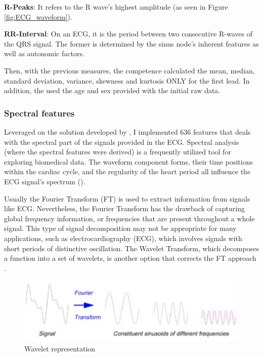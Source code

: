 \textbf{R-Peaks}: It refers to the R wave's highest amplitude (as seen in Figure \ref{fig:ECG_waveform}).

\textbf{RR-Interval}: On an ECG, it is the period between two consecutive R-waves of the QRS signal. The former is determined by the sinus node's inherent features as well as autonomic factors.

Then, with the previous measures, the competence calculated the mean, median, standard deviation, variance, skewness and kurtosis ONLY for the first lead. In addition, the used the age and sex provided with the initial raw data.

\subsubsection{Spectral features}

Leveraged on the solution developed by \cite{github_spectralfeatures}, I implemented 636 features that deals with the spectral part of the signals provided in the ECG. Spectral analysis (where the spectral features were derived) is a frequently utilized tool for exploring biomedical data. The waveform component forms, their time positions within the cardiac cycle, and the regularity of the heart period all influence the ECG signal's spectrum (\cite{spectralfeatures}). 

Usually the Fourier Transform (FT) is used to extract information from signals like ECG. Nevertheless, the Fourier Transform has the drawback of capturing global frequency information, or frequencies that are present throughout a whole signal. This type of signal decomposition may not be appropriate for many applications, such as electrocardiography (ECG), which involves signals with short periods of distinctive oscillation. The Wavelet Transform, which decomposes a function into a set of wavelets, is another option that corrects the FT approach \cite{spectral_features}.

\begin{figure}[H]
\centering
\includegraphics[scale=0.4]{img/wavelet.PNG}
\caption{Wavelet representation}
\label{fig:wavelet}
\end{figure}

